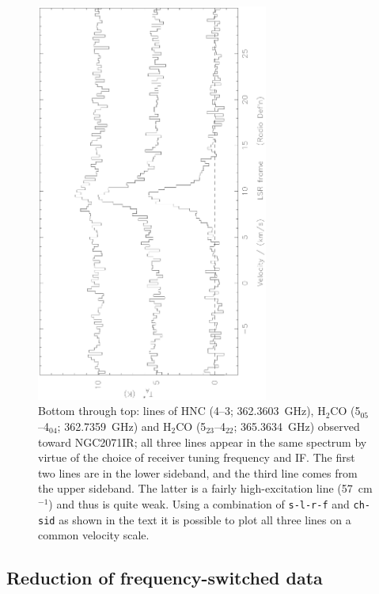 \documentclass[11pt,twoside]{article}
\begin{document}
\begin{figure}[htb]
\centering
\includegraphics[angle=-90,width=3.0in]{sc8_s-l-r-f.ps}
\vspace*{-0.5cm}
\begin{center}
\begin{minipage}[t]{5.5in}
\caption[Using s-l-r-f etc] 
{\small{Bottom through top: lines of HNC (4--3; 362.3603~GHz), H$_2$CO
(5$_{05}$--4$_{04}$; 362.7359~GHz) and H$_2$CO (5$_{23}$--4$_{22}$;
365.3634~GHz) observed toward NGC2071IR; all three lines appear in the
same spectrum by virtue of the choice of receiver tuning frequency and
IF. The first two lines are in the lower sideband, and the
third line comes from the upper sideband. The latter is a fairly
high-excitation line (57~cm$^{-1}$) and thus is quite weak. Using a
combination of {\tt s-l-r-f} and {\tt ch-sid} as shown in the text it
is possible to plot all three lines on a common velocity scale.
}}
\label{fig:s-l-r-f}
\end{minipage}
\end{center}
\end{figure}



\subsection{Reduction of frequency-switched data}
\label{sec:fsw-reduction}
\end{document}
